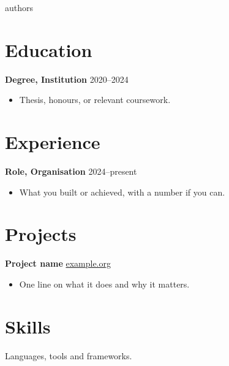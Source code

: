 \documentclass[11pt]{article}
\begin{document}
\begin{center}
{{authors}}
\end{center}

\section{Education}
\textbf{Degree, Institution} \hfill 2020--2024
\begin{itemize}
  \item Thesis, honours, or relevant coursework.
\end{itemize}

\section{Experience}
\textbf{Role, Organisation} \hfill 2024--present
\begin{itemize}
  \item What you built or achieved, with a number if you can.
\end{itemize}

\section{Projects}
\textbf{Project name} \hfill \href{https://example.org}{example.org}
\begin{itemize}
  \item One line on what it does and why it matters.
\end{itemize}

\section{Skills}
Languages, tools and frameworks.
\end{document}
